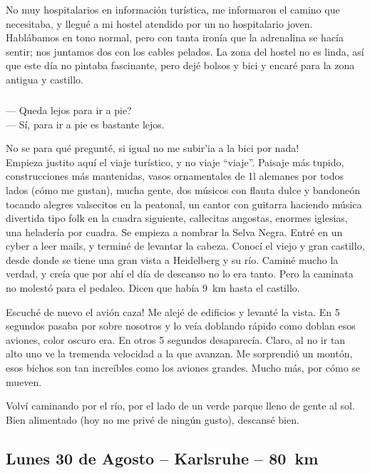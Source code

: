 No muy hospitalarios en informaci\'on tur\'istica, me informaron el camino que
necesitaba, y llegu\'e a mi hostel atendido por un no hospitalario joven.
Habl\'abamos en tono normal, pero con tanta iron\'ia que la adrenalina se
hac\'ia sentir; nos juntamos dos con los cables pelados. La zona del hostel no
es linda, as\'i que este d\'ia no pintaba fascinante, pero dej\'e bolsos y bici
y encar\'e para la zona antigua y castillo.

\subparagraph{}\label{ssub:Heidelberg} --- \textquestiondown Queda lejos para
ir a pie?\\ --- S\'i, para ir a pie es bastante lejos.\\ \hangindent=1cm

\textexclamdown No se para qu\'e pregunt\'e, si igual no me subir'ia a la
bici por nada!\\

Empieza justito aqu\'i el viaje tur\'istico, y no viaje ``viaje''. Paisaje
m\'as tupido, construcciones m\'as mantenidas, vasos ornamentales de 1l
alemanes por todos lados (c\'omo me gustan), mucha gente, dos m\'usicos con
flauta dulce y bandone\'on tocando alegres valsecitos en la peatonal, un
cantor con guitarra haciendo m\'usica divertida tipo folk en la cuadra
siguiente, callecitas angostas, enormes iglesias, una helader\'ia por cuadra.
Se empieza a nombrar la Selva Negra. Entr\'e en un cyber a leer mails, y
termin\'e de levantar la cabeza. Conoc\'i el viejo y gran castillo, desde donde
se tiene una gran vista a Heidelberg y su r\'io. Camin\'e mucho la verdad, y
cre\'ia que por ah\'i el d\'ia de descanso no lo era tanto. Pero la caminata no
molest\'o para el pedaleo. Dicen que hab\'ia 9~km hasta el castillo.

\textexclamdown Escuch\'e de nuevo el avi\'on caza! Me alej\'e de edificios y
levant\'e la vista. En 5 segundos pasaba por sobre nosotros y lo ve\'ia
doblando r\'apido como doblan esos aviones, color oscuro era. En otros 5
segundos desaparec\'ia. Claro, al no ir tan alto uno ve la tremenda velocidad
a la que avanzan. Me sorprendi\'o un mont\'on, esos bichos son tan
incre\'ibles como los aviones grandes. Mucho m\'as, por c\'omo se mueven.

Volv\'i caminando por el r\'io, por el lado de un verde parque lleno de gente
al sol. Bien alimentado (hoy no me priv\'e de ning\'un gusto), descans\'e bien.

\subsection*{Lunes 30 de Agosto -- Karlsruhe -- 80~km}

